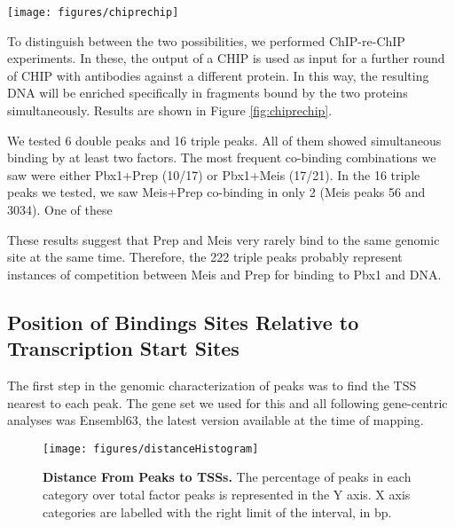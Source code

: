 \begin{SCfigure}[]
  \centering
  \texttt{[image: figures/chiprechip]}
  \caption[ChIP-re-ChIP experiments]{\textbf{ChIP-re-ChIP experiments.} Factors were subjected to succesive round of \ac{CHIP} with antibodies with different specificities, as indicated. Unspecific antibody (IgG) was used as a negative control. Purified DNA was amplified in a rate-limiting \ac{PCR} to obtain an amount of product roughly proportional to the peak DNA present. Band intensities over IgG band were considered as positive signals.}
  \label{fig:chiprechip}
\end{SCfigure}

To distinguish between the two possibilities, we performed ChIP-re-ChIP experiments. In these, the output of a \ac{CHIP} is used as input for a further round of \ac{CHIP} with antibodies against a different protein. In this way, the resulting DNA will be enriched specifically in fragments bound by the two proteins simultaneously. Results are shown in Figure \ref{fig:chiprechip}.

We tested 6 double peaks and 16 triple peaks. All of them showed simultaneous binding by at least two factors. The most frequent co-binding combinations we saw were either Pbx1+Prep (10/17) or Pbx1+Meis (17/21). In the 16 triple peaks we tested, we saw Meis+Prep co-binding in only 2 (Meis peaks 56 and 3034). One of these %

These results suggest that Prep and Meis very rarely bind to the same genomic site at the same time. Therefore, the 222 triple peaks probably represent instances of competition between Meis and Prep for binding to Pbx1 and DNA. %


\subsection{Position of Bindings Sites Relative to Transcription Start Sites}

The first step in the genomic characterization of peaks was to find the \ac{TSS} nearest to each peak. The gene set we used for this and all following gene-centric analyses was Ensembl63, the latest version available at the time of mapping.

\begin{figure}[]
  
  \centering
  \texttt{[image: figures/distanceHistogram]}
  \caption[Distance From Peaks to \ac{TSS}s]{\textbf{Distance From Peaks to \ac{TSS}s.} The percentage of peaks in each category over total factor peaks is represented in the Y axis. X axis categories are labelled with the right limit of the interval, in \ac{bp}.}
  \label{fig:distanceHistogram}
\end{figure}

